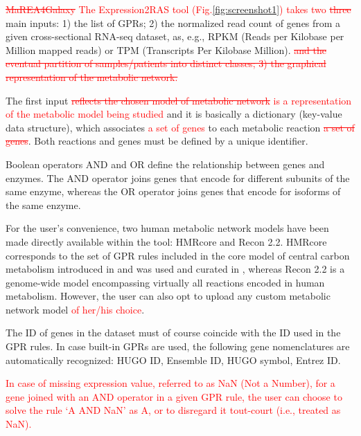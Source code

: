 \documentclass[preprint,12pt,authoryear]{elsarticle}
\newcommand{\red}{\textcolor{red}}
\newcommand{\mareagalaxy}{\textsf{MaREA4Galaxy}}
\newcommand{\RASTool}{\textsf{Expression2RAS}}
\begin{document}
\red{\sout{\mareagalaxy{}} The \RASTool{} tool
  (Fig.\ref{fig:screenshot1}) takes two \sout{three}} main inputs: 1)
the list of GPRs; 2) the normalized read count of genes from a given
cross-sectional RNA-seq dataset, as, e.g., RPKM (Reads per Kilobase per
Million mapped reads) or TPM (Transcripts Per Kilobase
Million). \red{\sout{and the eventual partition of samples/patients
    into distinct classes; 3) the graphical representation of the
    metabolic network.}}

The first input \red{\sout{reflects the chosen model of metabolic
    network} is a representation of the metabolic model being studied}
and it is basically a dictionary (key-value data structure), which
associates \red{a set of genes} to each metabolic reaction
\red{\sout{a set of genes}}. Both reactions and genes must be defined
by a unique identifier.

Boolean operators AND and OR define the relationship between genes and
enzymes.
%
The AND operator joins genes that encode for different subunits of the
same enzyme, whereas the OR operator joins genes that encode for
isoforms of the same enzyme.

For the user's convenience, two human metabolic network models have
been made directly available within the tool: \textsf{HMRcore} and
\textsf{Recon} 2.2. \textsf{HMRcore} corresponds to the set of GPR
rules included in the core model of central carbon metabolism
introduced in \citep{DiFilippo2016} and was used and curated in
\citep{popFBA,graudenzi2018fbaca,damiani2018integration,marea},
whereas \textsf{Recon} 2.2 \citep{swainston2016recon} is a genome-wide
model encompassing virtually all reactions encoded in human
metabolism.
%
However, the user can also opt to upload any custom metabolic network
model \red{of her/his choice}.

The ID of genes in the dataset must of course coincide with the ID
used in the GPR rules. In case built-in GPRs are used, the following
gene nomenclatures are automatically recognized: HUGO ID, Ensemble ID,
HUGO symbol, Entrez ID.

\red{In case of missing expression value, referred to as NaN (Not a
  Number), for a gene joined with an AND operator in a given GPR rule,
  the user can choose to solve the rule `A AND NaN' as A, or to
  disregard it tout-court (i.e., treated as NaN).}
\end{document}
